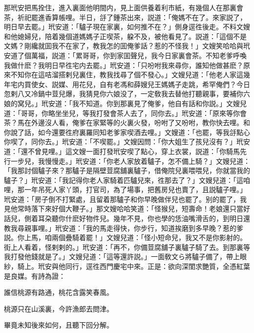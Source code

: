 那玳安把馬拴住，進入裏面他明間内，見上面供養着利市紙，有幾個人在那裏會茶，祈祀罷進香算帳哩。半日，㧱了鍾茶出來，説道：「俺媽不在了。來家説了，明日早去罷。」玳安道：「驢子現在家裏，如何推不在？」側身逕徃後走。不料文嫂和他媳婦兒，陪着幾個道媽媽子正喫茶，躱不及，被他看見了。説道：「這個不是文媽？剛纔就囬我不在家了，教我怎的囬俺爹話？惹的不怪我！」文嫂笑哈哈與玳安道了個萬福，説道：「累哥哥，你到家囬聲兒，我今日家裏會茶。不知老爹呼喚我做什麽？我明日早徃宅内去罷。」玳安道：「只吩咐我來尋你，誰知他做甚麽？原來不知你在這咭溜搭剌兒裏住，教我找尋了個不發心。」文嫂兒道：「他老人家這幾年宅内買使女、説媒、用花兒，自有老馮和薛嫂兒王媽媽子走跳，希罕俺們？今日忽剌八又冷鍋中荳兒爆，我猜見你六娘没了，一定敎我去替他打聽親事，要補你六娘的窝兒。」玳安道：「我不知道。你到那裏見了俺爹，他自有話和你説。」文嫂兒道：「哥哥，你略坐坐兒，等我打發會茶人去了，同你去。」玳安道：「原來等你會茶？馬在外邊沒人看，俺爹在家緊等的火裏火發，吩咐了又吩咐，教你快去哩。和你說了話，如今還要徃府裏羅同知老爹家喫酒去哩。」文嫂道：「也罷，等我㧱點心你喫了，同你去。」玳安道：「不喫罷。」文嫂因問：「你大姐生了孩兒沒有？」玳安道：「還不曾見哩。」這文嫂一面打發玳安喫了點心，穿上衣裳，説道：「你騎馬先行一步兒，我慢慢走。」玳安道：「你老人家放着驢子，怎不備上騎？」文嫂兒道：「我那討個驢子來？那驢子是隔壁荳腐舖裏驢子，借俺院兒裏喂喂兒，你就當我的驢子？」玳安道：「我記得你老人家騎着匹驢兒來，徃那去了？」文嫂兒道：「這咱哩，那一年吊死人家丫頭，打官司，為了場事，把舊房兒也賣了，且説驢子哩。」玳安道：「房子倒不打緊處，且留着那驢子和你早晚做伴兒也罷了。别的罷了，我見他常時落下來好個大鞭子。」那文嫂哈哈笑道：「怪猴兒，短壽命！老娘還只當好話兒，側着耳朶聽你什麽好物件兒。幾年不見，你也學的恁油嘴滑舌的，到明日還教我尋親事哩。」玳安道：「我的馬走得快，你步行，知道挨磨到多早晚？惹的爹説。你上馬，咱兩個疊騎着罷！」文嫂兒道：「怪小短命兒，我又不是你影射的。街上人看着，怪剌剌的。」玳安道：「再不，你備荳腐舖子裏驢子騎了去。到那裏等我打發他錢就是了。」文嫂兒道：「這等還許説。」一面敎文ら將驢子備了，帶上眼紗，騎上。玳安與他同行，逕徃西門慶宅中來。正是：欲向深閨求艷質，全憑紅葉是良媒。有詩為證：

\begin{myquote}
誰信桃源有路通，桃花含露笑春風。

桃源只在山溪裏，今許漁郎去問津。
\end{myquote}

畢竟未知後來如何，且聽下回分解。

